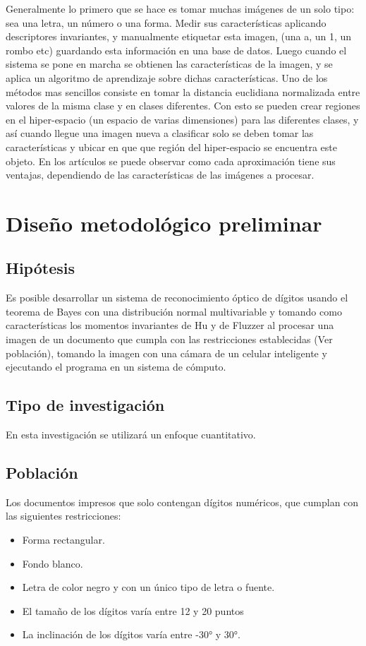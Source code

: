 \documentclass[a4paper, 11pt, oneside]{article}
\begin{document}
	Generalmente lo primero que se hace es tomar muchas imágenes de un solo tipo: sea una letra, un 
	número o una forma. Medir sus características aplicando descriptores invariantes, y manualmente 
    etiquetar esta imagen, (una a, un 1, un rombo etc) guardando esta información en una base de
    datos. Luego cuando el sistema se pone en marcha se obtienen las características de la imagen,
    y se aplica un algoritmo de aprendizaje sobre dichas características. Uno de los métodos mas
	sencillos consiste en tomar la distancia euclidiana normalizada entre valores de la misma
	clase y en clases diferentes. Con esto se pueden crear regiones en el hiper-espacio (un
	espacio de varias dimensiones) para las diferentes clases, y así cuando llegue una imagen
	nueva a clasificar solo se deben tomar las características y ubicar en que que región del
	hiper-espacio se encuentra este objeto. En los artículos se puede observar como  
	cada aproximación tiene sus ventajas, dependiendo de las características de las imágenes a
	procesar.
	\newpage
		
	\section{Diseño metodológico preliminar}
	
	\subsection{Hipótesis}
	Es posible desarrollar un sistema de reconocimiento óptico de dígitos usando el teorema
	de Bayes con una distribución normal multivariable y tomando como características los
	momentos invariantes de Hu y de Fluzzer al procesar una imagen de un documento que 
	cumpla con las restricciones establecidas (Ver población), tomando la imagen con
	una cámara de un celular inteligente y ejecutando el programa en un sistema de cómputo.
		
	\subsection{Tipo de investigación}
	En esta investigación se utilizará un enfoque cuantitativo.
	
	\subsection{Población}
	Los documentos impresos que solo contengan dígitos numéricos, que cumplan con las siguientes restricciones:
	\begin{itemize}
	\item Forma rectangular.
	\item Fondo blanco.
	\item Letra de color negro y con un único tipo de letra o fuente.
	\item El tamaño de los dígitos varía entre 12 y 20 puntos
	\item La inclinación de los dígitos varía entre -30° y 30°.
	\end{itemize}
	
\end{document}
